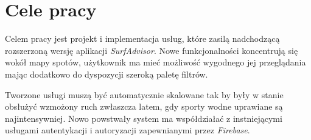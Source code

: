 \section{Cele pracy}
Celem pracy jest projekt i implementacja usług, które zasilą nadchodzącą rozszerzoną wersję aplikacji \emph{SurfAdvisor}.
Nowe funkcjonalności koncentrują się wokół mapy spotów, użytkownik ma mieć możliwość wygodnego jej przeglądania mając dodatkowo do dyspozycji szeroką paletę filtrów.

Tworzone usługi muszą być automatycznie skalowane tak by były w stanie obsłużyć wzmożony ruch zwłaszcza latem, gdy sporty wodne uprawiane są najintensywniej.
Nowo powstwały system ma współdziałać z instniejącymi usługami autentykacji i autoryzacji zapewnianymi przez \emph{Firebase}.

